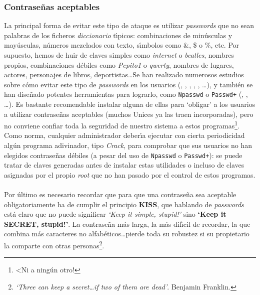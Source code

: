 \subsubsection{Contrase\~nas aceptables}
La principal forma de evitar este tipo de ataque es utilizar {\it passwords} 
que no sean palabras de los ficheros {\it diccionario} t\'{\i}picos: 
combinaciones de min\'usculas y may\'usculas, n\'umeros mezclados con texto, 
s\'{\i}mbolos como \&, \$ o \%, etc. Por supuesto, hemos de huir de claves
simples como {\it internet} o {\it beatles}, nombres propios, combinaciones 
d\'ebiles como {\it Pepito1} o {\it qwerty}, nombres de lugares, actores, 
personajes de libros, deportistas\ldots Se han realizado numerosos estudios
sobre c\'omo evitar este tipo de {\it passwords} en los usuarios 
(\cite{kn:alv88}, \cite{kn:kle90}, \cite{kn:spa91b}, \cite{kn:bel93}, 
\cite{kn:bis91}, \cite{kn:bis95}\dots), y tambi\'en se han dise\~nado potentes 
herramientas para lograrlo, como {\tt Npasswd} o {\tt Passwd+} 
(\cite{kn:spa91b}, \cite{kn:bis92}, \cite{kn:che92}\ldots). Es bastante 
recomendable instalar alguna de ellas para `obligar' a los usuarios a utilizar
contrase\~nas aceptables (muchos Unices ya las traen incorporadas), pero 
no conviene confiar toda la seguridad de nuestro sistema a estos 
programas\footnote{<Ni a ning\'un otro!}.
Como norma, cualquier administrador deber\'{\i}a ejecutar con cierta 
periodicidad alg\'un programa adivinador, tipo {\it Crack}, para comprobar que
sus usuarios no han elegidos contrase\~nas d\'ebiles (a pesar del uso de 
{\tt Npasswd} o {\tt Passwd+}): se puede tratar de claves generadas antes de
instalar estas utilidades o incluso de claves asignadas por el propio {\it root}
que no han pasado por el control de estos programas.\\%
\\Por \'ultimo es necesario recordar que para que una contrase\~na sea aceptable
obligatoriamente ha de cumplir el principio {\bf KISS}, que hablando de {\it
passwords} est\'a claro que no puede significar {\it `Keep it simple, stupid!'}
sino {\bf `Keep it SECRET, stupid!'}. La contrase\~na m\'as larga, la m\'as
dif\'{\i}cil de recordar,
la que combina m\'as caracteres no alfab\'eticos\ldots pierde toda su robustez
si su propietario la comparte con otras personas\footnote{{\it `Three can keep
a secret\ldots if two of them are dead'}. Benjamin Franklin.}.
